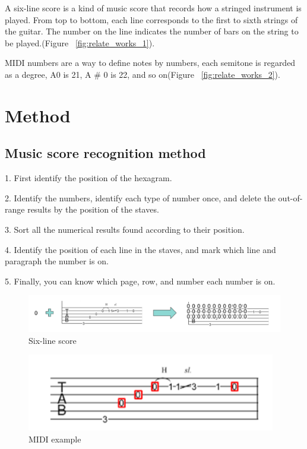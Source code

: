 \documentclass[10pt,twocolumn,letterpaper]{article}
\begin{document}
\begin{CJK}{UTF8}{bsmi}
A six-line score is a kind of music score that records how a stringed instrument is played. From top to bottom, each line corresponds to the first to sixth strings of the guitar. The number on the line indicates the number of bars on the string to be played.(Figure ~\ref{fig:relate_works_1}).

MIDI numbers are a way to define notes by numbers, each semitone is regarded as a degree, A0 is 21, A \# 0 is 22, and so on(Figure ~\ref{fig:relate_works_2}).


\section{Method}

\subsection{Music score recognition method}
\begin{description}
\item 1. First identify the position of the hexagram.
\item 2. Identify the numbers, identify each type of number once, and delete the out-of-range results by the position of the staves.
\item 3. Sort all the numerical results found according to their position.
\item 4. Identify the position of each line in the staves, and mark which line and paragraph the number is on.
\item 5. Finally, you can know which page, row, and number each number is on.
\end{description}


\begin{figure}[t]
\begin{center}
   \includegraphics[width=0.8\linewidth]{method_1.png}
\end{center}
   \caption{Six-line score}
\label{fig:method_1}
\end{figure}

\begin{figure}[t]
\begin{center}
   \includegraphics[width=0.8\linewidth]{method_2.png}
\end{center}
   \caption{MIDI example}
\label{fig:method_2}
\end{figure}



\end{CJK}
\end{document}
